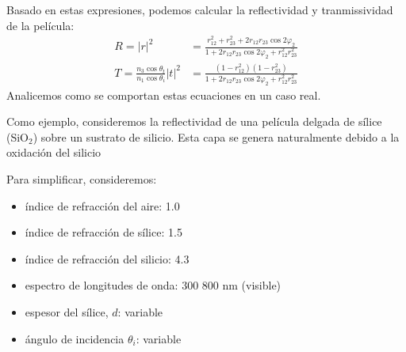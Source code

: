 \documentclass[letterpaper,10pt,english]{jupyterBook}
\let\sphinxpxdimen\pdfpxdimen\else\newdimen\sphinxpxdimen
\begin{document}
\sphinxAtStartPar
Basado en estas expresiones, podemos calcular la reflectividad y tranmissividad de la película:
\label{equation:2_ondas_EM_en_la_materia/2_ondas_EM_en_la_materia:66cb98b4-f45d-44c7-b747-8c13140f1a1b}\begin{align}
R = {\lvert r\rvert}^2 &= \frac{r_{12}^2+r_{23}^2+2r_{12}r_{23}\cos 2\varphi_2}
                              {1 + 2r_{12}r_{23}\cos 2\varphi_2 + r_{12}^2r_{23}^2}
\\[10pt]
T = \frac{n_3\cos\theta_t}{n_1\cos\theta_i}{\lvert t\rvert}^2 &= 
\frac{\left(1 - r_{12}^2\right)\left(1 - r_{23}^2\right)}
     {1 + 2r_{12}r_{23}\cos 2\varphi_2 + r_{12}^2r_{23}^2}
\end{align}
\sphinxAtStartPar
Analicemos como se comportan estas ecuaciones en un caso real.

\sphinxAtStartPar
Como ejemplo, consideremos la reflectividad de una película delgada de sílice (SiO\(_2\)) sobre un sustrato de silicio. Esta capa se genera naturalmente debido a la oxidación del silicio

\noindent{\hspace*{\fill}\sphinxincludegraphics[width=600\sphinxpxdimen]{{sio2_coating}.png}\hspace*{\fill}}

\sphinxAtStartPar
Para simplificar, consideremos:
\begin{itemize}
\item {} 
\sphinxAtStartPar
índice de refracción del aire: 1.0

\item {} 
\sphinxAtStartPar
índice de refracción de sílice: 1.5

\item {} 
\sphinxAtStartPar
índice de refracción del silicio: 4.3

\item {} 
\sphinxAtStartPar
espectro de longitudes de onda: 300 \sphinxhyphen{} 800 nm (visible)

\item {} 
\sphinxAtStartPar
espesor del sílice, \(d\): variable

\item {} 
\sphinxAtStartPar
ángulo de incidencia \(\theta_i\): variable

\end{itemize}
\end{document}
